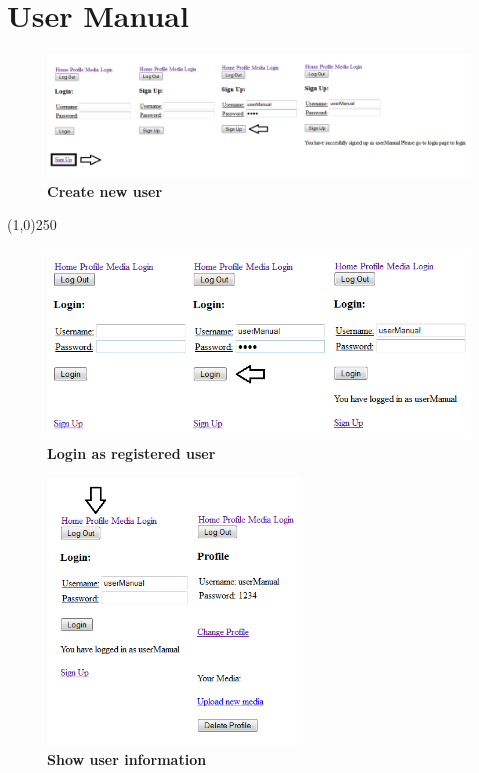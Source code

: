 \documentclass[11pt]{article}
\begin{document}
\newpage
~\\
\newpage

\section{User Manual}
\begin{figure}[H]
  \caption{\textbf{Create new user}}
  \centering
    \includegraphics[width=1\textwidth]{images/UM_new_user.png}
\end{figure}

\begin{center}\line(1,0){250}\end{center}

\begin{figure}[H]
  \caption{\textbf{Login as registered user}}
  \centering
    \includegraphics[width=1\textwidth]{images/UM_login.png}
\end{figure}

\begin{figure}[H]
  \caption{\textbf{Show user information}}
  \centering
    \includegraphics[width=0.6\textwidth]{images/UM_show_user.png}
\end{figure}
\end{document}
